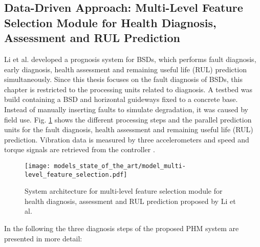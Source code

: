 \subsection{Data-Driven Approach: Multi-Level Feature Selection Module for Health Diagnosis, Assessment and RUL Prediction}
Li et al. \cite{LiPin2018} developed a prognosis system for BSDs, which performs fault diagnosis, early diagnosis, health assessment and remaining useful life (RUL) prediction simultaneously. Since this thesis focuses on the fault diagnosis of BSDs, this chapter is restricted to the processing units related to diagnosis. A testbed was build containing a BSD and horizontal guideways fixed to a concrete base. Instead of manually inserting faults to simulate degradation, it was caused by field use. Fig.  \ref{fig:level_feature_selection_model} shows the different processing steps and the parallel prediction units for the fault diagnosis, health assessment and remaining useful life (RUL) prediction. Vibration data is measured by three accelerometers and speed and torque signals are retrieved from the controller \cite{LiPin2018}. 

\begin{figure}[H]
  \centering
  \texttt{[image: models\_state\_of\_the\_art/model\_multi-level\_feature\_selection.pdf]}
  \caption{System architecture for multi-level feature selection module for health diagnosis, assessment and RUL prediction proposed by Li et al. \cite{LiPin2018}}
  \label{fig:level_feature_selection_model}
\end{figure}

In the following the three diagnosis steps of the proposed PHM system are presented in more detail:

